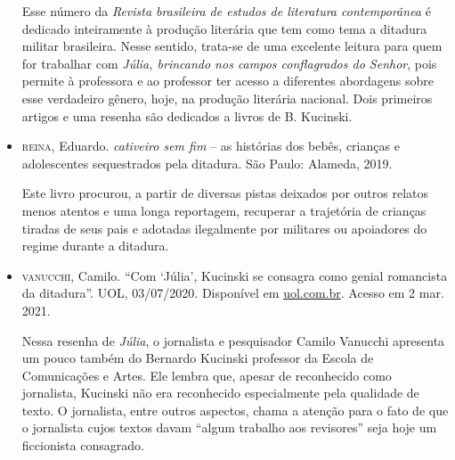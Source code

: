 \documentclass[12pt]{extarticle}
\begin{document}
\begin{itemize}
Esse número da \emph{Revista brasileira de estudos de literatura
contemporânea} é dedicado inteiramente à produção literária que tem como
tema a ditadura militar brasileira. Nesse sentido, trata-se de uma
excelente leitura para quem for trabalhar com \emph{Júlia, brincando nos
campos conflagrados do Senhor}, pois permite à professora e ao professor
ter acesso a diferentes abordagens sobre esse verdadeiro gênero, hoje,
na produção literária nacional. Dois primeiros artigos e uma resenha são
dedicados a livros de B. Kucinski.

\item \textsc{reina}, Eduardo. \emph{cativeiro sem fim} -- as histórias dos bebês,
crianças e adolescentes sequestrados pela ditadura. São Paulo: Alameda,
2019.

Este livro procurou, a partir de diversas pistas deixados por outros
relatos menos atentos e uma longa reportagem, recuperar a trajetória de
crianças tiradas de seus pais e adotadas ilegalmente por militares ou
apoiadores do regime durante a ditadura.

\item \textsc{vanucchi}, Camilo. ``Com `Júlia', Kucinski se consagra como genial
romancista da ditadura''. UOL, 03/07/2020. Disponível em
\href{https://noticias.uol.com.br/colunas/camilo-vannuchi/2020/07/03/com-julia-kucinski-se-consagra-como-genial-romancista-da-ditadura.htm}{{uol.com.br}}.
Acesso em 2 mar. 2021.

Nessa resenha de \emph{Júlia}, o jornalista e pesquisador Camilo
Vanucchi apresenta um pouco também do Bernardo Kucinski professor da
Escola de Comunicações e Artes. Ele lembra que, apesar de reconhecido
como jornalista, Kucinski não era reconhecido especialmente pela
qualidade de texto. O jornalista, entre outros aspectos, chama a atenção
para o fato de que o jornalista cujos textos davam ``algum trabalho aos
revisores'' seja hoje um ficcionista consagrado.
\end{itemize}
\end{document}
